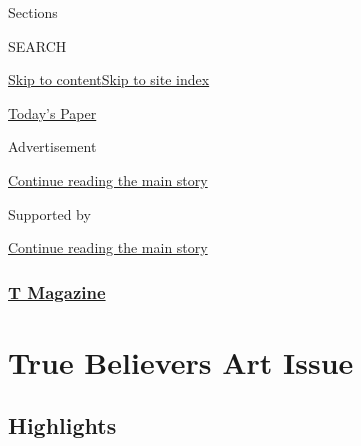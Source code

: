 Sections

SEARCH

\protect\hyperlink{site-content}{Skip to
content}\protect\hyperlink{site-index}{Skip to site index}

\href{https://myaccount.nytimes3xbfgragh.onion/auth/login?response_type=cookie\&client_id=vi}{}

\href{https://www.nytimes3xbfgragh.onion/section/todayspaper}{Today's
Paper}

Advertisement

\protect\hyperlink{after-top}{Continue reading the main story}

Supported by

\protect\hyperlink{after-sponsor}{Continue reading the main story}

\hypertarget{t-magazine}{%
\subsubsection{\texorpdfstring{\href{/section/t-magazine}{T
Magazine}}{T Magazine}}\label{t-magazine}}

\hypertarget{true-believers-art-issue}{%
\section{True Believers Art Issue}\label{true-believers-art-issue}}

\hypertarget{highlights}{%
\subsection{Highlights}\label{highlights}}


